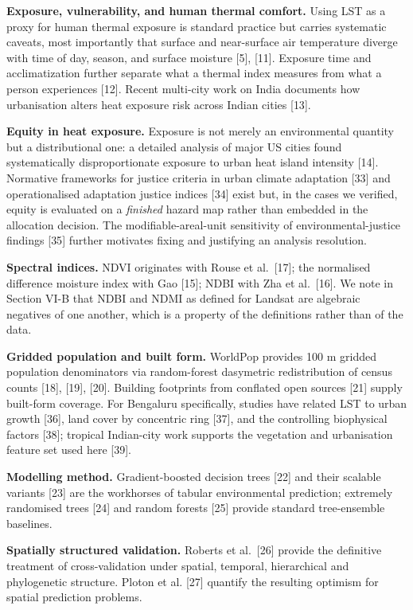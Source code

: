 \textbf{Exposure, vulnerability, and human thermal comfort.} Using LST as a proxy for human thermal
exposure is standard practice but carries systematic caveats, most importantly that surface and
near-surface air temperature diverge with time of day, season, and surface moisture {[}5{]}, {[}11{]}.
Exposure time and acclimatization further separate what a thermal index measures from what a person
experiences {[}12{]}. Recent multi-city work on India documents how urbanisation alters heat exposure
risk across Indian cities {[}13{]}.

\textbf{Equity in heat exposure.} Exposure is not merely an environmental quantity but a distributional
one: a detailed analysis of major US cities found systematically disproportionate exposure to urban
heat island intensity {[}14{]}. Normative frameworks for justice criteria in urban climate adaptation
{[}33{]} and operationalised adaptation justice indices {[}34{]} exist but, in the cases we verified, equity
is evaluated on a \emph{finished} hazard map rather than embedded in the allocation decision. The
modifiable-areal-unit sensitivity of environmental-justice findings {[}35{]} further motivates fixing and
justifying an analysis resolution.

\textbf{Spectral indices.} NDVI originates with Rouse et al.~{[}17{]}; the normalised difference moisture index
with Gao {[}15{]}; NDBI with Zha et al.~{[}16{]}. We note in Section VI-B that NDBI and NDMI as defined for
Landsat are algebraic negatives of one another, which is a property of the definitions rather than of
the data.

\textbf{Gridded population and built form.} WorldPop provides 100 m gridded population denominators via
random-forest dasymetric redistribution of census counts {[}18{]}, {[}19{]}, {[}20{]}. Building footprints from
conflated open sources {[}21{]} supply built-form coverage. For Bengaluru specifically, studies have
related LST to urban growth {[}36{]}, land cover by concentric ring {[}37{]}, and the controlling
biophysical factors {[}38{]}; tropical Indian-city work supports the vegetation and urbanisation feature
set used here {[}39{]}.

\textbf{Modelling method.} Gradient-boosted decision trees {[}22{]} and their scalable variants {[}23{]} are the
workhorses of tabular environmental prediction; extremely randomised trees {[}24{]} and random forests
{[}25{]} provide standard tree-ensemble baselines.

\textbf{Spatially structured validation.} Roberts et al.~{[}26{]} provide the definitive treatment of
cross-validation under spatial, temporal, hierarchical and phylogenetic structure. Ploton et al.
{[}27{]} quantify the resulting optimism for spatial prediction problems.

